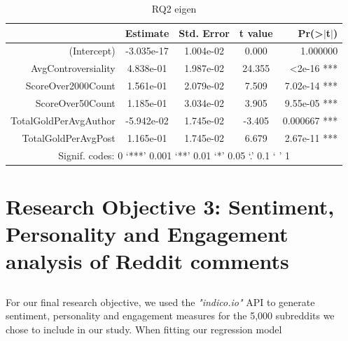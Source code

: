 \documentclass[bsc,frontabs,twoside,singlespacing,parskip,deptreport]{infthesis}
\begin{document}
\begin{table}[]
\centering
\caption{RQ2 eigen}
\label{tab:rq2-eigen}
\begin{tabular}{rcccr}
\hline
                      & Estimate   & Std. Error & t value & Pr(\textgreater{}$\rvert$t$\rvert$) \\ \hline
(Intercept)           & -3.035e-17 & 1.004e-02  & 0.000   & 1.000000                            \\
AvgControversiality   & 4.838e-01  & 1.987e-02  & 24.355  & \textless 2e-16 ***                 \\
ScoreOver2000Count    & 1.561e-01  & 2.079e-02  & 7.509   & 7.02e-14 ***                        \\
ScoreOver50Count      & 1.185e-01  & 3.034e-02  & 3.905   & 9.55e-05 ***                        \\
TotalGoldPerAvgAuthor & -5.942e-02 & 1.745e-02  & -3.405  & 0.000667 ***                        \\
TotalGoldPerAvgPost   & 1.165e-01  & 1.745e-02  & 6.679   & 2.67e-11 ***                        \\ \hline
\multicolumn{5}{c}{Signif. codes:  0 ‘***’ 0.001 ‘**’ 0.01 ‘*’ 0.05 ‘.’ 0.1 ‘ ’ 1}              \\ \hline
\end{tabular}
\end{table}


\chapter{Research Objective 3: Sentiment, Personality and Engagement analysis of Reddit comments}\label{content-analysis-results}

\section{}

For our final research objective, we used the \textit{"indico.io"} API to generate sentiment, personality and engagement measures for the 5,000 subreddits we chose to include in our study. When fitting our regression model
\end{document}
